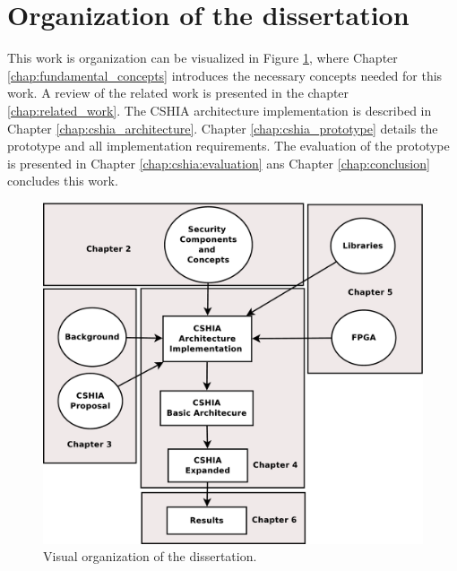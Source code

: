 
\section{Organization of the dissertation}
\label{sec:organization_of_dissertation}
This work is organization can be visualized  in Figure \ref{fig:orgvisual}, where Chapter \ref{chap:fundamental_concepts} introduces the necessary concepts  needed for this work. A review of the related work is presented in the chapter \ref{chap:related_work}.  The CSHIA architecture implementation is described in Chapter \ref{chap:cshia_architecture}. Chapter \ref{chap:cshia_prototype} details the prototype and all implementation requirements. The evaluation of the prototype is presented in Chapter \ref{chap:cshia:evaluation} ans Chapter \ref{chap:conclusion} concludes this work.
\begin{figure}[!ht]
	\centering
	\includegraphics[scale=0.4]{figures/pdf/organization.pdf}
	\caption{Visual organization of the dissertation.}
	\label{fig:orgvisual}
\end{figure}

